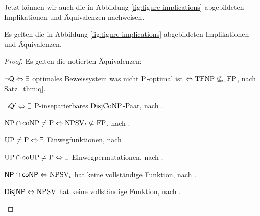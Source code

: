Jetzt können wir auch die in Abbildung \ref{fig:figure-implications} abgebildeten Implikationen und Äquivalenzen nachweisen.
\begin{theorem}\label{thm:figure-implications}
    Es gelten die in Abbildung \ref{fig:figure-implications} abgebildeten Implikationen und Äquivalenzen.
\end{theorem}
\begin{proof}
    Es gelten die notierten Äquivalenzen:
    \begin{Prooflist}[nosep,midpenalty=0]
        \item $\neg\hQ \Leftrightarrow \exists$ optimales Beweissystem was nicht $\P$-optimal ist $\Leftrightarrow \TFNP\not\subseteq_\mathrm{c} \FP$, nach Satz~\ref{thm:q}.
        \item $\neg\hQ' \Leftrightarrow\exists$ P-inseparierbares $\DisjCoNP$-Paar, nach \textcite[Lemma~2.12, vgl. Appendix]{fortnow_separability_1993}.
        \item $\NP\cap\coNP\neq\P \Leftrightarrow \NPSV_t\not\subseteq\FP$, nach \textcite[Prop.~1]{fenner_inverting_2003}.
    \item $\UP\neq\P \Leftrightarrow\exists$ Einwegfunktionen, nach \textcite[Thm.~10]{grollmann_complexity_1988}.
    \item $\UP\cap\coUP\neq\P \Leftrightarrow\exists$ Einwegpermutationen, nach \textcite{homan_one-way_2003}.
    \item $\hNPcoNP \Leftrightarrow \NPSV_t$ hat keine vollständige Funktion, nach \textcite[Prop.~3]{beyersdorff_nondeterministic_2009}.
    \item $\hDisjNP \Leftrightarrow \NPSV$ hat keine vollständige Funktion, nach \textcite[Thm.~9]{glaser_reductions_2005}.
    \end{Prooflist}


\end{proof}
